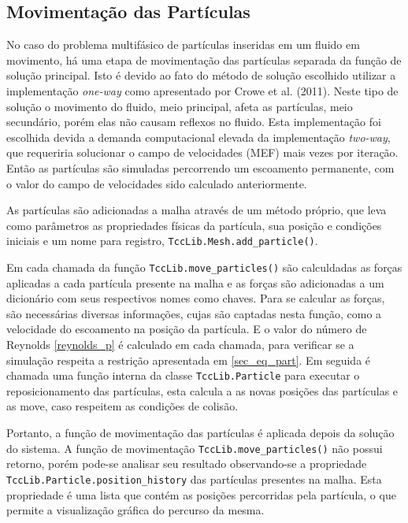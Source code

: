 \subsection{\textbf{Movimentação das Partículas}}
No caso do problema multifásico de partículas inseridas em um fluido em movimento, há uma etapa de movimentação das partículas separada da função de solução principal.
Isto é devido ao fato do método de solução escolhido utilizar a implementação \textit{one-way} como apresentado por Crowe et al. (2011)\cite{crowe}.
Neste tipo de solução o movimento do fluido, meio principal,  afeta as partículas, meio secundário, porém elas não causam reflexos no fluido.
Esta implementação foi escolhida devida a demanda computacional elevada da implementação \textit{two-way}, que requeriria solucionar o campo de velocidades (MEF) mais vezes por iteração.
Então as partículas são simuladas percorrendo um escoamento permanente, com o valor do campo de velocidades sido calculado anteriormente.

As partículas são adicionadas a malha através de um método próprio, que leva como parâmetros as propriedades físicas da partícula, sua posição e condições iniciais e um nome para registro, \verb|TccLib.Mesh.add_particle()|.

Em cada chamada da função \verb|TccLib.move_particles()| são calculdadas as forças aplicadas a cada partícula presente na malha e as forças são adicionadas a um dicionário com seus respectivos nomes como chaves.
Para se calcular as forças, são necessárias diversas informações, cujas são captadas nesta função, como a velocidade do escoamento na posição da partícula.
E o valor do número de Reynolds \eqref{reynolds_p} é calculado em cada chamada, para verificar se a simulação respeita a restrição apresentada em \ref{sec_eq_part}.
Em seguida é chamada uma função interna da classe \verb|TccLib.Particle| para executar o reposicionamento das partículas, esta calcula a as novas posições das partículas e as move, caso respeitem as condições de colisão.

Portanto, a função de movimentação das partículas é aplicada depois da solução do sistema.
A função de movimentação \verb|TccLib.move_particles()| não possui retorno, porém pode-se analisar seu resultado observando-se a propriedade \verb|TccLib.Particle.position_history| das partículas presentes na malha.
Esta propriedade é uma lista que contém as posições percorridas pela partícula, o que permite a visualização gráfica do percurso da mesma.